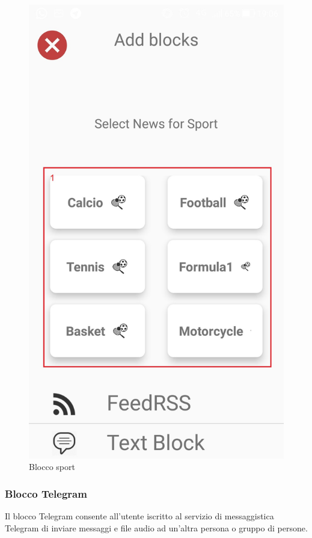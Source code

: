 \begin{figure}[!ht]
	\centering
	\includegraphics[scale=0.2]{images/BlockSport.jpg}
	\caption{Blocco sport}
\end{figure}

\subsubsection{Blocco Telegram}
Il blocco Telegram consente all'utente iscritto al servizio di messaggistica Telegram di inviare messaggi e file audio ad un'altra persona o gruppo di persone.

